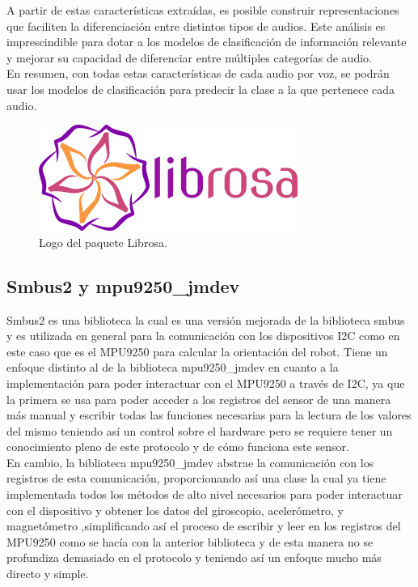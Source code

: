 A partir de estas características extraídas, es posible construir representaciones que faciliten la diferenciación entre distintos tipos de audios. Este análisis es imprescindible para dotar a los modelos de clasificación de información relevante y mejorar su capacidad de diferenciar entre múltiples categorías de audio.\\

En resumen, con todas estas características de cada audio por voz, se podrán usar los modelos de clasificación para predecir la clase a la que pertenece cada audio. 

\begin{figure}[H]
  \centering
  \includegraphics[scale=0.4]{figs/librosa} %
  \caption{Logo del paquete Librosa.}
  \label{fig:librosa}
\end{figure}


\subsection{Smbus2 y mpu9250\_jmdev}
\label{subsec:smbus2mpu9250jmdev}


Smbus2 es una biblioteca la cual es una versión mejorada de la biblioteca smbus y es utilizada en general para la comunicación con los dispositivos I2C como en este caso que es el MPU9250 para calcular la orientación del robot. Tiene un enfoque distinto al de la biblioteca mpu9250\_jmdev en cuanto a la implementación para poder interactuar con el MPU9250 a través de I2C, ya que la primera se usa para poder acceder a los registros del sensor de una manera más manual y escribir todas las funciones necesarias para la lectura de los valores del mismo teniendo así un control sobre el hardware pero se requiere tener un conocimiento pleno de este protocolo y de cómo funciona este sensor.\\

En cambio, la biblioteca mpu9250\_jmdev abstrae la comunicación con los registros de esta comunicación, proporcionando así una clase la cual ya tiene implementada todos los métodos de alto nivel necesarios para poder interactuar con el dispositivo y obtener los datos del giroscopio, acelerómetro, y magnetómetro ,simplificando así el proceso de escribir y leer en los registros del MPU9250 como se hacía con la anterior biblioteca y de esta manera no se profundiza demasiado en el protocolo y teniendo así un enfoque mucho más directo y simple.

